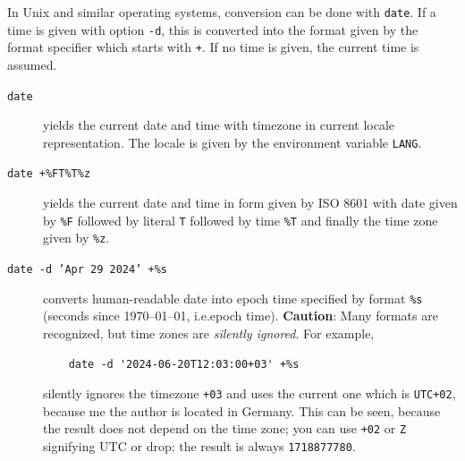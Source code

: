 \documentclass[a4paper]{article}%
\begin{document}
In Unix and similar operating systems, conversion can be done with \texttt{date}. 
If a time is given with option \texttt{-d}, 
this is converted into the format given by the format specifier which starts with \texttt{+}. 
If no time is given, the current time is assumed. 
%
\begin{description}
  \item[\texttt{date}] 
  yields the current date and time with timezone in current locale representation. 
  The locale is given by the environment variable \texttt{LANG}. 
  \item[\texttt{date +\%FT\%T\%z}] 
  yields the current date and time 
  in form given by ISO 8601 with date given by \texttt{\%F} followed by literal \texttt{T} 
  followed by time \texttt{\%T} and finally the time zone given by \texttt{\%z}. 
  \item[\texttt{date -d 'Apr 29 2024' +\%s}] %
  converts human-readable date into epoch time specified by format \texttt{\%s} 
  (seconds since 1970--01--01, i.e.\@ epoch time). 
  \textbf{Caution}: Many formats are recognized, but time zones are \emph{silently ignored}. 
  For example, 
  \begin{verbatim}
    date -d '2024-06-20T12:03:00+03' +%s
  \end{verbatim}
  silently ignores the timezone \texttt{+03} 
  and uses the current one which is \texttt{UTC+02}, because me the author is located in Germany. 
  This can be seen, because the result does not depend on the time zone; 
  you can use \texttt{+02} or \texttt{Z} signifying UTC or drop: 
  the result is always \texttt{1718877780}. 
  

\end{description}
\end{document}
